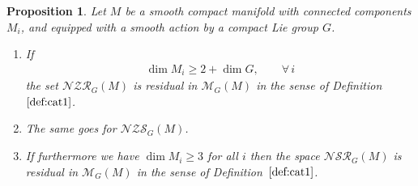 \documentclass[10pt,a4paper]{amsart}
\numberwithin{equation}{section}
\newtheorem{Proposition}[Theorem]{Proposition}
\begin{document}
\begin{Proposition}\label{pr:ncrgen}
 Let $M$ be a smooth compact manifold with connected components $M_i$, and equipped with a smooth action by a compact Lie group $G$.
 \begin{enumerate}[$(a)$]\itemsep=0pt
 \item\label{item:5} If
 \begin{gather*}
 \dim M_i\ge 2+\dim G,\qquad \forall\, i
 \end{gather*}
 the set $\mathcal{NZR}_G(M)$ is residual in $\mathcal{M}_G(M)$ in the sense of Definition~$\ref{def:cat1}$.
 \item\label{item:7} The same goes for $\mathcal{NZS}_G(M)$.
 \item\label{item:6}
 If furthermore we have $\dim M_i\ge 3$ for all $i$ then the space $\mathcal{NSR}_G(M)$ is residual in $\mathcal{M}_G(M)$ in the sense of Definition~$\ref{def:cat1}$.
 \end{enumerate}
\end{Proposition}
\end{document}
